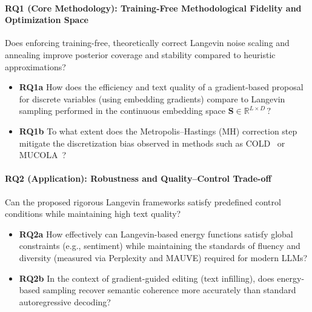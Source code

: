 \documentclass[11pt]{article}
\begin{document}
\paragraph{RQ1 (Core Methodology): Training-Free Methodological Fidelity and Optimization Space}
Does enforcing training-free, theoretically correct Langevin noise scaling and annealing improve posterior coverage and stability compared to heuristic approximations?

\begin{itemize}
    \item \textbf{RQ1a}
    How does the efficiency and text quality of a gradient-based proposal for discrete variables (using embedding gradients) compare to Langevin sampling performed in the continuous embedding space
    \(
    \mathbf{S} \in \mathbb{R}^{L \times D} \, ?
    \)
    \item \textbf{RQ1b}
    To what extent does the Metropolis--Hastings (MH) correction step mitigate the discretization bias observed in methods such as COLD~\cite{10.5555/3600270.3600963} or MUCOLA~\cite{kumar2022gradientbasedconstrainedsamplinglanguage}?
\end{itemize}



\paragraph{RQ2 (Application): Robustness and Quality--Control Trade-off}
Can the proposed rigorous Langevin frameworks satisfy predefined control conditions while maintaining high text quality?

\begin{itemize}
    \item \textbf{RQ2a}
    How effectively can Langevin-based energy functions satisfy global constraints (e.g., sentiment) while maintaining the standards of fluency and diversity (measured via Perplexity and MAUVE) required for modern LLMs?
    \item \textbf{RQ2b}
    In the context of gradient-guided editing (text infilling), does energy-based sampling recover semantic coherence more accurately than standard autoregressive decoding?
\end{itemize}
\end{document}
